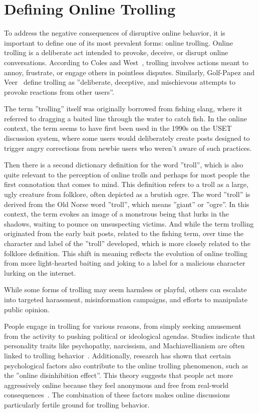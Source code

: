 \documentclass[twoside]{ctuthesis}
\theoremstyle{plain}
\theoremstyle{definition}
\theoremstyle{note}
\begin{document}
\section{Defining Online Trolling}
To address the negative consequences of disruptive online behavior, it is important to define one of its most prevalent forms: online trolling. Online trolling is a deliberate act intended to provoke, deceive, or disrupt online conversations. According to Coles and West~\cite{Coles2016}, trolling involves actions meant to annoy, frustrate, or engage others in pointless disputes. Similarly, Golf-Papez and Veer~\cite{GolfPapez2017DontFeedTheTroll} define trolling as ''deliberate, deceptive, and mischievous attempts to provoke reactions from other users''.\par

The term ''trolling'' itself was originally borrowed from fishing slang, where it referred to dragging a baited line through the water to catch fish. In the online context, the term seems to have first been used in the 1990s on the USET discussion system, where some users would deliberately create posts designed to trigger angry corrections from newbie users who weren't aware of such practices.\par

Then there is a second dictionary definition for the word ''troll'', which is also quite relevant to the perception of online trolls and perhaps for most people the first connotation that comes to mind. This definition refers to a troll as a large, ugly creature from folklore, often depicted as a brutish ogre. The word ''troll'' is derived from the Old Norse word ''troll'', which means ''giant'' or ''ogre''. In this context, the term evokes an image of a monstrous being that lurks in the shadows, waiting to pounce on unsuspecting victims. And while the term trolling originated from the early bait posts, related to the fishing term, over time the character and label of the ''troll'' developed, which is more closely related to the folklore definition. This shift in meaning reflects the evolution of online trolling from more light-hearted baiting and joking to a label for a malicious character lurking on the internet\cite{Demsar2021}.\par

While some forms of trolling may seem harmless or playful, others can escalate into targeted harassment, misinformation campaigns, and efforts to manipulate public opinion.\par
People engage in trolling for various reasons, from simply seeking amusement from the activity to pushing political or ideological agendas. Studies indicate that personality traits like psychopathy, narcissism, and Machiavellianism are often linked to trolling behavior~\cite{Buckels2014TrollsWantToHaveFun}. Additionally, research has shown that certain psychological factors also contribute to the online trolling phenomenon, such as the ''online disinhibition effect''. This theory suggests that people act more aggressively online because they feel anonymous and free from real-world consequences~\cite{Suler2004}. The combination of these factors makes online discussions particularly fertile ground for trolling behavior. \par
\end{document}
